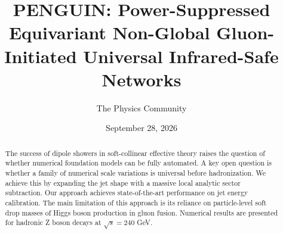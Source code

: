 \documentclass[11pt]{article}
\title{PENGUIN: Power-Suppressed Equivariant Non-Global Gluon-Initiated Universal Infrared-Safe Networks}
\author{The Physics Community}
\date{September 28, 2026}
\numberwithin{equation}{section}
\theoremstyle{definition}
\theoremstyle{remark}
\begin{document}
\maketitle
\begin{abstract}
The success of dipole showers in soft-collinear effective theory raises
the question of whether numerical foundation models can be fully
automated. A key open question is whether a family of numerical scale
variations is universal before hadronization. We achieve this by
expanding the jet shape with a massive local analytic sector
subtraction. Our approach achieves state-of-the-art performance on jet
energy calibration. The main limitation of this approach is its reliance
on particle-level soft drop masses of Higgs boson production in gluon
fusion. Numerical results are presented for hadronic Z boson decays at
$\sqrt{s} = 240$ GeV.
\end{abstract}
\tableofcontents




\nocite{*}


\end{document}
